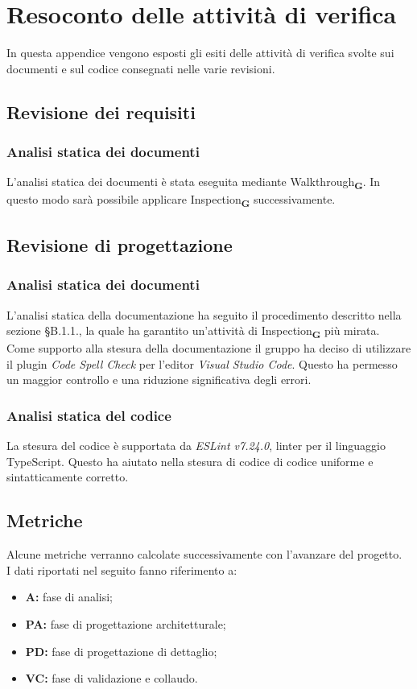 \section{Resoconto delle attività di verifica}
In questa appendice vengono esposti gli esiti delle attività di verifica svolte sui documenti e sul codice consegnati nelle varie revisioni.
\subsection{Revisione dei requisiti}
\subsubsection{Analisi statica dei documenti}
L'analisi statica dei documenti è stata eseguita mediante Walkthrough\textsubscript{\textbf{G}}. In questo modo sarà possibile applicare Inspection\textsubscript{\textbf{G}} successivamente.
\subsection{Revisione di progettazione}
\subsubsection{Analisi statica dei documenti}
L'analisi statica della documentazione ha seguito il procedimento descritto nella sezione §B.1.1., la quale ha garantito un'attività di Inspection\textsubscript{\textbf{G}} più mirata.\\
Come supporto alla stesura della documentazione il gruppo ha deciso di utilizzare il plugin \textit{Code Spell Check} per l'editor \textit{Visual Studio Code}. Questo ha permesso un maggior controllo e
una riduzione significativa degli errori.
\subsubsection{Analisi statica del codice}
La stesura del codice è supportata da \textit{ESLint v7.24.0}, linter per il linguaggio TypeScript. Questo ha aiutato nella stesura di codice di codice uniforme e sintatticamente corretto.
\subsection{Metriche}
Alcune metriche verranno calcolate successivamente con l'avanzare del progetto.\\
I dati riportati nel seguito fanno riferimento a:
\begin{itemize}
    \item \textbf{A:} fase di analisi;
    \item \textbf{PA:} fase di progettazione architetturale;
    \item \textbf{PD:} fase di progettazione di dettaglio;
    \item \textbf{VC:} fase di validazione e collaudo.
\end{itemize}
